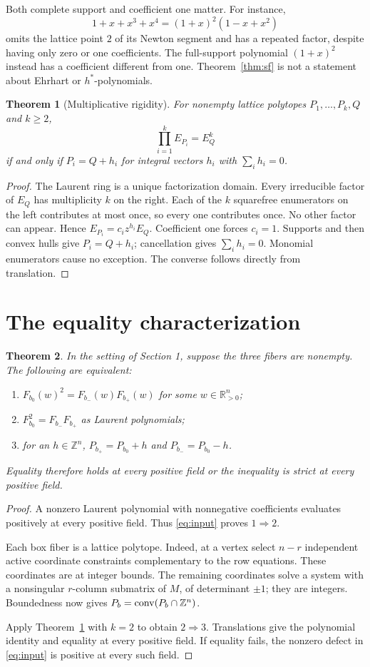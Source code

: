 \documentclass[11pt]{article}
\newtheorem{theorem}{Theorem}[section]
\newcommand{\Z}{\mathbb Z}\newcommand{\R}{\mathbb R}\newcommand{\C}{\mathbb C}
\begin{document}
Both complete support and coefficient one matter. For instance,
\[
1+x+x^3+x^4=(1+x)^2(1-x+x^2)
\]
omits the lattice point \(2\) of its Newton segment and has a repeated factor, despite having only zero or one coefficients. The full-support polynomial \((1+x)^2\) instead has a coefficient different from one. Theorem~\ref{thm:sf} is not a statement about Ehrhart or \(h^*\)-polynomials.

\begin{theorem}[Multiplicative rigidity]\label{thm:mult}
For nonempty lattice polytopes \(P_1,\ldots,P_k,Q\) and \(k\ge2\),
\[
\prod_{i=1}^kE_{P_i}=E_Q^k
\]
if and only if \(P_i=Q+h_i\) for integral vectors \(h_i\) with \(\sum_i h_i=0\).
\end{theorem}
\begin{proof}
The Laurent ring is a unique factorization domain. Every irreducible factor of \(E_Q\) has multiplicity \(k\) on the right. Each of the \(k\) squarefree enumerators on the left contributes at most once, so every one contributes once. No other factor can appear. Hence
\(E_{P_i}=c_i z^{h_i}E_Q\).
Coefficient one forces \(c_i=1\). Supports and then convex hulls give \(P_i=Q+h_i\); cancellation gives \(\sum_i h_i=0\). Monomial enumerators cause no exception. The converse follows directly from translation.
\end{proof}

\section{The equality characterization}
\begin{theorem}\label{thm:main}
In the setting of Section 1, suppose the three fibers are nonempty. The following are equivalent:
\begin{enumerate}
\item \(F_{b_0}(w)^2=F_{b_-}(w)F_{b_+}(w)\) for some \(w\in\R_{>0}^n\);
\item \(F_{b_0}^2=F_{b_-}F_{b_+}\) as Laurent polynomials;
\item for an \(h\in\Z^n\),
\(P_{b_+}=P_{b_0}+h\) and \(P_{b_-}=P_{b_0}-h\).
\end{enumerate}
Equality therefore holds at every positive field or the inequality is strict at every positive field.
\end{theorem}
\begin{proof}
A nonzero Laurent polynomial with nonnegative coefficients evaluates positively at every positive field. Thus \eqref{eq:input} proves \(1\Rightarrow2\).

Each box fiber is a lattice polytope. Indeed, at a vertex select \(n-r\) independent active coordinate constraints complementary to the row equations. These coordinates are at integer bounds. The remaining coordinates solve a system with a nonsingular \(r\)-column submatrix of \(M\), of determinant \(\pm1\); they are integers. Boundedness now gives
\(P_b=\conv(P_b\cap\Z^n)\).

Apply Theorem~\ref{thm:mult} with \(k=2\) to obtain \(2\Rightarrow3\).
Translations give the polynomial identity and equality at every positive field. If equality fails, the nonzero defect in \eqref{eq:input} is positive at every such field.
\end{proof}
\end{document}
